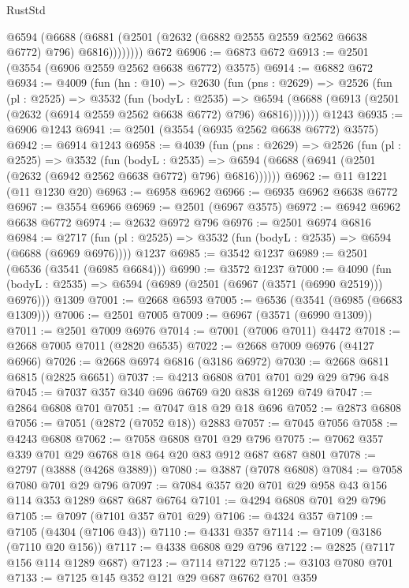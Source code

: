 \begin{lexlean}{RustStd}
\begin{coremodule}
            @6594
              (@6688 (@6881 (@2501 (@2632 (@6882 @2555 @2559 @2562 @6638 @6772) @796) @6816))))))))
    @672
@6906 := @6873 @672
@6913 := @2501 (@3554 (@6906 @2559 @2562 @6638 @6772) @3575)
@6914 := @6882 @672
@6934 := @4009
    (fun (hn : @10) =>
    @2630
      (fun (pns : @2629) =>
      @2526
        (fun (pl : @2525) =>
        @3532
          (fun (bodyL : @2535) =>
          @6594 (@6688 (@6913 (@2501 (@2632 (@6914 @2559 @2562 @6638 @6772) @796) @6816)))))))
    @1243
@6935 := @6906 @1243
@6941 := @2501 (@3554 (@6935 @2562 @6638 @6772) @3575)
@6942 := @6914 @1243
@6958 := @4039
    (fun (pns : @2629) =>
    @2526
      (fun (pl : @2525) =>
      @3532
        (fun (bodyL : @2535) =>
        @6594 (@6688 (@6941 (@2501 (@2632 (@6942 @2562 @6638 @6772) @796) @6816))))))
@6962 := @11 @1221 (@11 @1230 @20)
@6963 := @6958 @6962
@6966 := @6935 @6962 @6638 @6772
@6967 := @3554 @6966
@6969 := @2501 (@6967 @3575)
@6972 := @6942 @6962 @6638 @6772
@6974 := @2632 @6972 @796
@6976 := @2501 @6974 @6816
@6984 := @2717
    (fun (pl : @2525) => @3532 (fun (bodyL : @2535) => @6594 (@6688 (@6969 @6976))))
    @1237
@6985 := @3542 @1237
@6989 := @2501 (@6536 (@3541 (@6985 @6684)))
@6990 := @3572 @1237
@7000 := @4090
    (fun (bodyL : @2535) => @6594 (@6989 (@2501 (@6967 (@3571 (@6990 @2519))) @6976)))
    @1309
@7001 := @2668 @6593
@7005 := @6536 (@3541 (@6985 (@6683 @1309)))
@7006 := @2501 @7005
@7009 := @6967 (@3571 (@6990 @1309))
@7011 := @2501 @7009 @6976
@7014 := @7001 (@7006 @7011) @4472
@7018 := @2668 @7005 @7011 (@2820 @6535)
@7022 := @2668 @7009 @6976 (@4127 @6966)
@7026 := @2668 @6974 @6816 (@3186 @6972)
@7030 := @2668 @6811 @6815 (@2825 @6651)
@7037 := @4213 @6808 @701 @701 @29 @29 @796 @48
@7045 := @7037 @357 @340 @696 @6769 @20 @838 @1269 @749
@7047 := @2864 @6808 @701
@7051 := @7047 @18 @29 @18 @696
@7052 := @2873 @6808
@7056 := @7051 (@2872 (@7052 @18)) @2883
@7057 := @7045 @7056
@7058 := @4243 @6808
@7062 := @7058 @6808 @701 @29 @796
@7075 := @7062 @357 @339 @701 @29 @6768 @18 @64 @20 @83 @912 @687 @687 @801
@7078 := @2797 (@3888 (@4268 @3889))
@7080 := @3887 (@7078 @6808)
@7084 := @7058 @7080 @701 @29 @796
@7097 := @7084 @357 @20 @701 @29 @958 @43 @156 @114 @353 @1289 @687 @687 @6764
@7101 := @4294 @6808 @701 @29 @796
@7105 := @7097 (@7101 @357 @701 @29)
@7106 := @4324 @357
@7109 := @7105 (@4304 (@7106 @43))
@7110 := @4331 @357
@7114 := @7109 (@3186 (@7110 @20 @156))
@7117 := @4338 @6808 @29 @796
@7122 := @2825 (@7117 @156 @114 @1289 @687)
@7123 := @7114 @7122
@7125 := @3103 @7080 @701
@7133 := @7125 @145 @352 @121 @29 @687 @6762 @701 @359

\end{coremodule}
\end{lexlean}
